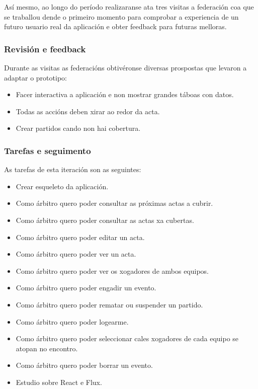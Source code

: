     Así mesmo, ao longo do período realizaranse ata tres visitas a federación 
coa que se traballou dende o primeiro momento para comprobar a experiencia de 
un futuro usuario real da aplicación e obter feedback para futuras melloras.

      \subsubsection{Revisión e feedback}
      Durante as visitas as federacións obtivéronse diversas prospostas que 
levaron a adaptar o prototipo:

      \begin{itemize}
        \item Facer interactiva a aplicación e non mostrar grandes táboas con 
datos.
        \item Todas as accións deben xirar ao redor da acta.
        \item Crear partidos cando non hai cobertura.
      \end{itemize}

      \subsubsection{Tarefas e seguimento}

      As tarefas de esta iteración son as seguintes:

      \begin{itemize}
        \item Crear esqueleto da aplicación.
        \item Como árbitro quero poder consultar as próximas actas a 
cubrir.
        \item Como árbitro quero poder consultar as actas xa cubertas.
        \item Como árbitro quero poder editar un acta.
        \item Como árbitro quero poder ver un acta.
        \item Como árbitro quero poder ver os xogadores de ambos equipos.
        \item Como árbitro quero poder engadir un evento.
        \item Como árbitro quero poder rematar ou suspender un partido.
        \item Como árbitro quero poder logearme.
        \item Como árbitro quero poder seleccionar cales xogadores de cada 
equipo se atopan no encontro.
        \item Como árbitro quero poder borrar un evento.
        \item Estudio sobre React e Flux.
       \end{itemize}

